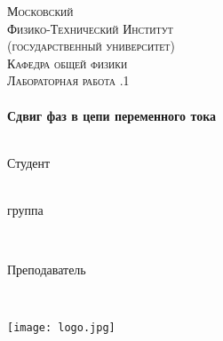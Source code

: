 \begin{titlepage}
\center %
 

\textsc{\LARGE Московский\\[-0.2cm]Физико-Технический Институт\\[0.1cm]\large (государственный университет)}\\[1.5cm] %
\textsc{\Large Кафедра общей физики}\\[0.1cm] %
\textsc{\large Лабораторная работа .1}\\[0.5cm] %


\HRule
\\[0.6cm]
{ \huge \bfseries Сдвиг фаз в цепи переменного тока}
\\[0.4cm] %
\HRule
\\[1.5cm]


 

\begin{minipage}{0.4\textwidth}
	\begin{flushleft} \large
		\textsf{Студент}
		
		 
 \\[2mm]
		\underline{\hspace{10mm}} группа
	\end{flushleft}
\end{minipage}
~
\begin{minipage}{0.4\textwidth}
	\begin{flushright} \large
		\textsf{Преподаватель}
		
		  \\[2mm]
	\end{flushright}
\end{minipage}

\begin{bottompar}
	\begin{center}
		\texttt{[image: logo.jpg]}
	\end{center}

\end{bottompar}
\vfill %

\end{titlepage}